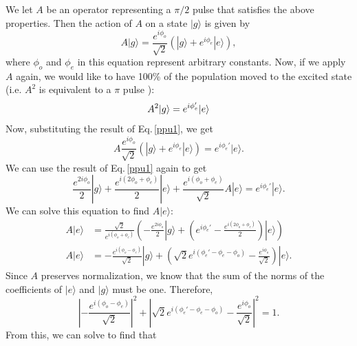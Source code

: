 We let $A$ be an operator representing a $\pi/2$ pulse that satisfies the above properties. Then the action of $A$ on a state $|g\rangle$ is given by 
\begin{equation} \label{ppu1}
A|g\rangle = \frac{e^{i\phi_o}}{\sqrt{2}} \left(|g\rangle + e^{i\phi_e}|e\rangle\right),
\end{equation}
where $\phi_o$ and $\phi_e$ in this equation represent arbitrary constants.
Now, if we apply $A$ again, we would like to have 100\% of the population moved to the excited state (i.e. $A^2$ is equivalent to a $\pi$ pulse ): 
\begin{equation}
A^2|g\rangle = e^{i\phi_e'}|e\rangle\\
\end{equation}
Now, substituting the result of Eq.\,\eqref{ppu1}, we get
\begin{equation}
A\frac{e^{i\phi_o}}{\sqrt{2}} \left(|g\rangle + e^{i\phi_e}|e\rangle\right)=e^{i\phi_e'}|e\rangle.
\end{equation}
We can use the result of Eq.\,\eqref{ppu1} again to get 
\begin{equation}
\frac{e^{2i\phi_o}}{2}
|g\rangle
+
\frac{e^{i(2\phi_o+\phi_e)}}{2} |e\rangle
+
\frac{e^{i(\phi_o+\phi_e)}}{\sqrt{2}}
A|e\rangle
=e^{i\phi_e'}|e\rangle.
\end{equation}
We can solve this equation to find $A|e\rangle$: 
\begin{align}
A|e\rangle&= 
\frac{\sqrt{2}}{e^{i(\phi_o+\phi_e)}}
\left(
-\frac{e^{2i\phi_o}}{2}|g\rangle
+\left(e^{i\phi_e'}-\frac{e^{i(2\phi_o+\phi_e)}}{2}\right) |e\rangle
\right)\\
A|e\rangle&= 
-\frac{e^{i(\phi_o-\phi_e)}}{\sqrt{2}}|g\rangle
+\left(\sqrt{2}e^{i(\phi_e'-\phi_e-\phi_o)}-\frac{e^{i\phi_o}}{\sqrt{2}}\right) |e\rangle. \label{Aemidddle}
\end{align}
Since $A$ preserves normalization, we know that the sum of the norms of the coefficients of $|e\rangle$ and $|g\rangle$ must be one. Therefore, 
\begin{equation}
\left|-\frac{e^{i(\phi_o-\phi_e)}}{\sqrt{2}}\right|^2 + \left|\sqrt{2}e^{i(\phi_e'-\phi_e-\phi_o)}-\frac{e^{i\phi_o}}{\sqrt{2}}\right|^2 = 1.
\end{equation}
From this, we can solve to find that  

